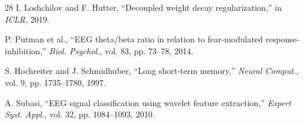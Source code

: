 \documentclass[journal,twoside]{IEEEtran}
\begin{document}
\begin{thebibliography}{28}
I. Loshchilov and F. Hutter, ``Decoupled weight decay regularization,'' in \textit{ICLR}, 2019.

P. Putman et al., ``EEG theta/beta ratio in relation to fear-modulated response-inhibition,'' \textit{Biol. Psychol.}, vol. 83, pp. 73--78, 2014.

S. Hochreiter and J. Schmidhuber, ``Long short-term memory,'' \textit{Neural Comput.}, vol. 9, pp. 1735--1780, 1997.

A. Subasi, ``EEG signal classification using wavelet feature extraction,'' \textit{Expert Syst. Appl.}, vol. 32, pp. 1084--1093, 2010.

\end{thebibliography}
\end{document}
